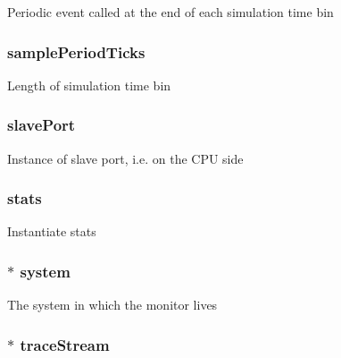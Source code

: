 \label{classCommMonitor_a59f6dafc1b1b5cf7eda2e4a47a47c515}
Periodic event called at the end of each simulation time bin \hypertarget{classCommMonitor_a087522d1bccfcac06ee7396d5da731e9}{
\subsubsection[{samplePeriodTicks}]{ {\bf samplePeriodTicks}}}
\label{classCommMonitor_a087522d1bccfcac06ee7396d5da731e9}
Length of simulation time bin \hypertarget{classCommMonitor_a3a2b0c2e0b88fa0a90bf89c0d7e6809e}{
\subsubsection[{slavePort}]{ {\bf slavePort}}}
\label{classCommMonitor_a3a2b0c2e0b88fa0a90bf89c0d7e6809e}
Instance of slave port, i.e. on the CPU side \hypertarget{classCommMonitor_a271fb3be9460a6727cb088bba7fde65e}{
\subsubsection[{stats}]{ {\bf stats}}}
\label{classCommMonitor_a271fb3be9460a6727cb088bba7fde65e}
Instantiate stats \hypertarget{classCommMonitor_af27ccd765f13a4b7bd119dc7579e2746}{
\subsubsection[{system}]{$\ast$ {\bf system}}}
\label{classCommMonitor_af27ccd765f13a4b7bd119dc7579e2746}
The system in which the monitor lives \hypertarget{classCommMonitor_afcb6a80c2432e45a3730484625ee1d20}{
\subsubsection[{traceStream}]{$\ast$ {\bf traceStream}}}
